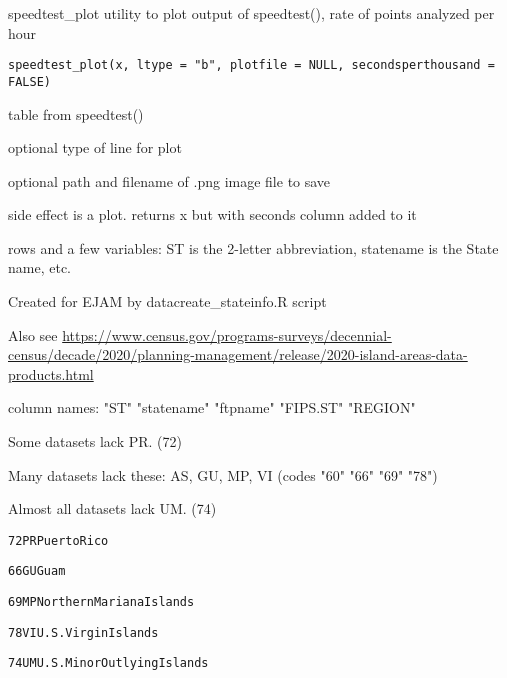 \documentclass[a4paper]{book}
\begin{document}
%
\begin{Description}\relax
speedtest\_plot
utility to plot output of speedtest(), rate of points analyzed per hour
\end{Description}
%
\begin{Usage}
\begin{verbatim}
speedtest_plot(x, ltype = "b", plotfile = NULL, secondsperthousand = FALSE)
\end{verbatim}
\end{Usage}
%
\begin{Arguments}
\begin{ldescription}
\item[\code{x}] table from speedtest()

\item[\code{ltype}] optional type of line for plot

\item[\code{plotfile}] optional path and filename of .png image file to save
\end{ldescription}
\end{Arguments}
%
\begin{Value}
side effect is a plot. returns x but with seconds column added to it
\end{Value}
%
\begin{SeeAlso}\relax
{}
\end{SeeAlso}
%
\begin{Description} rows and a few variables: ST is the 2-letter abbreviation,
statename is the State name, etc.
\end{Description}
%
\begin{Details}\relax
Created for EJAM by datacreate\_stateinfo.R script

Also see \url{https://www.census.gov/programs-surveys/decennial-census/decade/2020/planning-management/release/2020-island-areas-data-products.html}

column names: "ST"  "statename"  "ftpname"   "FIPS.ST"   "REGION"

Some datasets lack PR. (72)

Many datasets lack these:  AS, GU, MP, VI (codes "60" "66" "69" "78")

Almost all datasets lack UM. (74)

\begin{alltt}    72 PR                 Puerto Rico
    
    66 GU                        Guam 
    
    69 MP    Northern Mariana Islands  
    
    78 VI         U.S. Virgin Islands 
    
    74 UM U.S. Minor Outlying Islands  
\end{alltt}

\end{Details}
\end{document}

